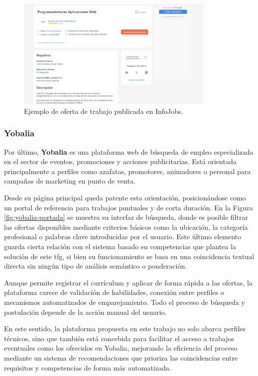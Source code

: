 \begin{figure}[H]
    \centering
    \includegraphics[width=0.85\textwidth]{figs/infojobs-oferta.png}
    \caption{Ejemplo de oferta de trabajo publicada en InfoJobs.}
    \label{fig:infojobs-oferta}
\end{figure}

\subsubsection{Yobalia}

Por último, \textbf{Yobalia} \cite{yobalia} es una plataforma web de búsqueda de empleo especializada en 
el sector de eventos, promociones y acciones publicitarias. Está orientada principalmente a perfiles como 
azafatas, promotores, animadores o personal para campañas de marketing en punto de venta.

Desde su página principal queda patente esta orientación, posicionándose como un portal de referencia 
para trabajos puntuales y de corta duración. En la Figura \ref{fig:yobalia-portada} se muestra su interfaz 
de búsqueda, donde es posible filtrar las ofertas disponibles mediante criterios básicos como la ubicación, 
la categoría profesional o palabras clave introducidas por el usuario. Este último elemento guarda cierta 
relación con el sistema basado en competencias que plantea la solución de este \gls{tfg}, si bien su 
funcionamiento se basa en una coincidencia textual directa sin ningún tipo de análisis semántico o ponderación.

Aunque permite registrar el currículum y aplicar de forma rápida a las ofertas, la plataforma carece de 
validación de habilidades, conexión entre perfiles o mecanismos automatizados de emparejamiento. Todo el 
proceso de búsqueda y postulación depende de la acción manual del usuario.

En este sentido, la plataforma propuesta en este trabajo no solo abarca perfiles técnicos, sino que también 
está concebida para facilitar el acceso a trabajos eventuales como los ofrecidos en Yobalia, mejorando la 
eficiencia del proceso mediante un sistema de recomendaciones que prioriza las coincidencias entre requisitos 
y competencias de forma más automatizada.

